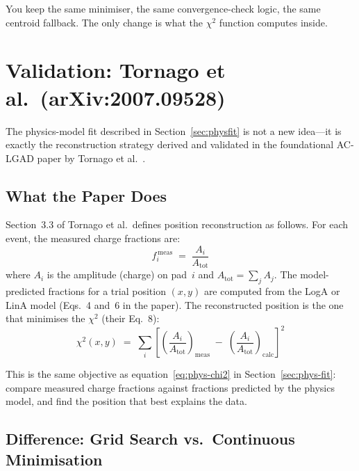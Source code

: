 \documentclass[11pt,a4paper]{article}
\begin{document}
\medskip\noindent
You keep the same minimiser, the same convergence-check logic, the same
centroid fallback.  The only change is what the $\chi^{2}$ function
computes inside.

\section{Validation: Tornago et al.\ (arXiv:2007.09528)}
\label{sec:tornago}

The physics-model fit described in Section~\ref{sec:physfit} is not a
new idea---it is exactly the reconstruction strategy derived and
validated in the foundational AC-LGAD paper by Tornago et al.~\cite{tornago2021}.

\subsection{What the Paper Does}

Section~3.3 of Tornago et al.\ defines position reconstruction as
follows.  For each event, the measured charge fractions are:
\begin{equation}
  f_i^{\,\text{meas}} \;=\; \frac{A_i}{A_{\text{tot}}}
  \label{eq:tornago-fmeas}
\end{equation}
where $A_i$ is the amplitude (charge) on pad~$i$ and
$A_{\text{tot}} = \sum_j A_j$.  The model-predicted fractions for a
trial position $(x, y)$ are computed from the LogA or LinA model
(Eqs.~4 and~6 in the paper).  The reconstructed position is the one
that minimises the $\chi^{2}$ (their Eq.~8):
\begin{equation}
  \chi^{2}(x, y)
    \;=\; \sum_{i}
      \left[
        \left(\frac{A_i}{A_{\text{tot}}}\right)_{\!\text{meas}}
        \;-\;
        \left(\frac{A_i}{A_{\text{tot}}}\right)_{\!\text{calc}}
      \right]^{2}
  \label{eq:tornago-chi2}
\end{equation}

\noindent
This is the same objective as equation~\eqref{eq:phys-chi2} in
Section~\ref{sec:phys-fit}: compare measured charge fractions against
fractions predicted by the physics model, and find the position that
best explains the data.

\subsection{Difference: Grid Search vs.\ Continuous Minimisation}
\end{document}
